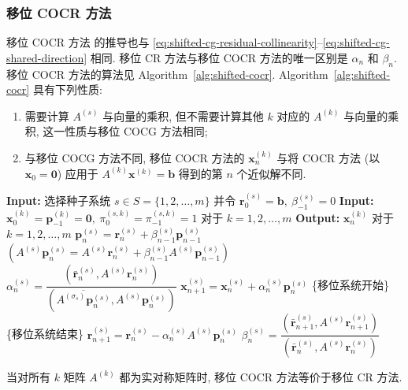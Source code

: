 \subsubsection{{移位 COCR 方法}}\label{subsec:shifted-cocr}
{移位 COCR 方法  的推导也与 \eqref{eq:shifted-cg-residual-collinearity}--\eqref{eq:shifted-cg-shared-direction} 相同. 移位 CR 方法与移位 COCR 方法的唯一区别是 $\alpha_n$ 和 $\beta_n$. 移位 COCR 方法的算法见 Algorithm\ \ref{alg:shifted-cocr}.}
{Algorithm\ \ref{alg:shifted-cocr} 具有下列性质:}
\begin{enumerate}
\item {需要计算 $A^{(s)}$ 与向量的乘积, 但不需要计算其他 $k$ 对应的 $A^{(k)}$ 与向量的乘积, 这一性质与移位 COCG 方法相同;}
\item {与移位 COCG 方法不同, 移位 COCR 方法的 $\bm x_n^{(k)}$ 与将 COCR 方法 (以 $\bm x_0=\bm0$) 应用于 $A^{(k)}\bm x^{(k)}=\bm b$ 得到的第 $n$ 个近似解不同.}
\end{enumerate}
\begin{algorithm}[H]\caption{{移位 COCR 方法 (注意: $(\bar{\bm a},\bm b)=\bm a^{\top}\bm b$)}}\label{alg:shifted-cocr}\begin{algorithmic}[1]
\Statex\textbf{Input:} {选择种子系统 $s\in S=\{1,2,\ldots,m\}$ 并令 $\bm r_0^{(s)}=\bm b,\ \beta_{-1}^{(s)}=0$}
\Statex\textbf{Input:} $\bm x_0^{(k)}=\bm p_{-1}^{(k)}=\bm0,\ \pi_0^{(s,k)}=\pi_{-1}^{(s,k)}=1$ {对于} $k=1,2,\ldots,m$
\Statex\textbf{Output:} $\bm x_n^{(k)}$ {对于} $k=1,2,\ldots,m$
\State $\bm p_n^{(s)}=\bm r_n^{(s)}+\beta_{n-1}^{(s)}\bm p_{n-1}^{(s)}$
\State $(A^{(s)}\bm p_n^{(s)}=A^{(s)}\bm r_n^{(s)}+\beta_{n-1}^{(s)}A^{(s)}\bm p_{n-1}^{(s)})$
\State $\alpha_n^{(s)}=\dfrac{(\bar{\bm r}_n^{(s)},A^{(s)}\bm r_n^{(s)})}{(\overline{A^{(\sigma_s)}\bm p_n^{(s)}},A^{(s)}\bm p_n^{(s)})}$
\State $\bm x_{n+1}^{(s)}=\bm x_n^{(s)}+\alpha_n^{(s)}\bm p_n^{(s)}$
\State \{{移位系统开始}\}
\State \{{移位系统结束}\}
\State $\bm r_{n+1}^{(s)}=\bm r_n^{(s)}-\alpha_n^{(s)}A^{(s)}\bm p_n^{(s)}$
\State $\beta_n^{(s)}=\dfrac{(\bar{\bm r}_{n+1}^{(s)},A^{(s)}\bm r_{n+1}^{(s)})}{(\bar{\bm r}_n^{(s)},A^{(s)}\bm r_n^{(s)})}$
\EndFor\end{algorithmic}\end{algorithm}
{当对所有 $k$ 矩阵 $A^{(k)}$ 都为实对称矩阵时, 移位 COCR 方法等价于移位 CR 方法.}

